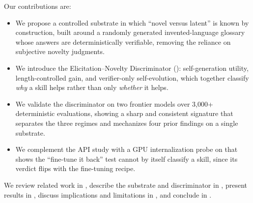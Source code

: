 Our contributions are:
\begin{itemize}[leftmargin=*,itemsep=0pt,topsep=0pt]
    \item We propose a controlled substrate in which ``novel versus latent'' is known by
    construction, built around a randomly generated invented-language glossary whose answers
    are deterministically verifiable, removing the reliance on subjective novelty judgments.
    \item We introduce the Elicitation--Novelty Discriminator (\END): self-generation utility,
    length-controlled gain, and verifier-only self-evolution, which together classify
    \emph{why} a skill helps rather than only \emph{whether} it helps.
    \item We validate the discriminator on two frontier models over 3{,}000+ deterministic
    evaluations, showing a sharp and consistent signature that separates the three regimes and
    mechanizes four prior findings on a single substrate.
    \item We complement the API study with a GPU internalization probe on \qwen that shows the
    ``fine-tune it back'' test cannot by itself classify a skill, since its verdict flips with
    the fine-tuning recipe.
\end{itemize}

We review related work in , describe the substrate and discriminator in
, present results in , discuss implications and
limitations in , and conclude in .
